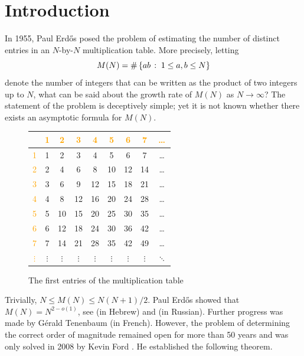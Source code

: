 \section{Introduction}

In 1955, Paul Erd\H{o}s \cite{someremarksonnumbertheory} posed the problem of estimating the number of distinct entries in an $N$-by-$N$ multiplication table. 
More precisely, letting 
\begin{equation*}
    M(N) = \#\left\{ab\,:\;1 \le a, b \le N\right\}
\end{equation*}
denote the number of integers that can be written as the product of two integers up to $N$, what can be said about the growth rate of $M(N)$ as $N \rightarrow \infty$?
The statement of the problem is deceptively simple; yet it is not known whether there exists an asymptotic formula for $M(N)$.

\begin{figure}[h]
    \centering
    \begin{tabular}{c|cccccccc}
        & \textcolor{orange}{1} & \textcolor{orange}{2} & \textcolor{orange}{3} & \textcolor{orange}{4} & \textcolor{orange}{5} & \textcolor{orange}{6} & \textcolor{orange}{7} & \textcolor{orange}{\dots} \\ \hline
        \textcolor{orange}{1} & 1 & 2 & 3 & 4 & 5 & 6 & 7 & \dots \\ 
        \textcolor{orange}{2} & 2 & 4 & 6 & 8 & 10 & 12 & 14 & \dots \\ 
        \textcolor{orange}{3} & 3 & 6 & 9 & 12 & 15 & 18 & 21 & \dots \\ 
        \textcolor{orange}{4} & 4 & 8 & 12 & 16 & 20 & 24 & 28 & \dots \\ 
        \textcolor{orange}{5} & 5 & 10 & 15 & 20 & 25 & 30 & 35 & \dots \\ 
        \textcolor{orange}{6} & 6 & 12 & 18 & 24 & 30 & 36 & 42 & \dots \\ 
        \textcolor{orange}{7} & 7 & 14 & 21 & 28 & 35 & 42 & 49 & \dots \\ 
        \textcolor{orange}{$\vdots$} & $\vdots$ & $\vdots$ & $\vdots$ & $\vdots$ & $\vdots$ & $\vdots$ & $\vdots$ & $\ddots$ \\
    \end{tabular}
    \caption{The first entries of the multiplication table}
    \label{table:multiplication-table}
\end{figure}

Trivially, $N \le M(N) \le N(N + 1)/2$. 
Paul Erd\H{o}s showed that $M(N) = N^{2 - o(1)}$, see \cite{someremarksonnumbertheory} (in Hebrew) and \cite{anasymptoticinequality} (in Russian).
Further progress was made by Gérald Tenenbaum \cite{tenenbaumsurlaprobabilite} (in French).
However, the problem of determining the correct order of magnitude remained open for more than 50 years and was only solved in 2008 by Kevin Ford \cite{thedistributionofintegers, integerswithadivisor}.
He established the following theorem.

